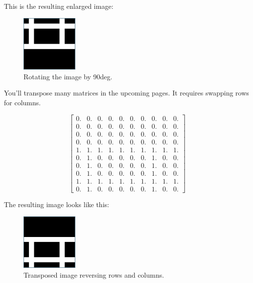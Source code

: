 This is the resulting enlarged image:

\begin{figure}[htbp]
    \centering
    \includegraphics[width=0.25\textwidth]{rotate90.png}
    \caption{Rotating the image by 90deg.}
    \label{fig:rotate90matrix}
\end{figure}

You'll transpose many matrices in the upcoming pages. It requires swapping 
rows for columns. 

$$\begin{bmatrix}
0. & 0. & 0. & 0. & 0. & 0. & 0. & 0. & 0. & 0.\\
0. & 0. & 0. & 0. & 0. & 0. & 0. & 0. & 0. & 0.\\
0. & 0. & 0. & 0. & 0. & 0. & 0. & 0. & 0. & 0.\\
0. & 0. & 0. & 0. & 0. & 0. & 0. & 0. & 0. & 0.\\
1. & 1. & 1. & 1. & 1. & 1. & 1. & 1. & 1. & 1.\\
0. & 1. & 0. & 0. & 0. & 0. & 0. & 1. & 0. & 0.\\
0. & 1. & 0. & 0. & 0. & 0. & 0. & 1. & 0. & 0.\\
0. & 1. & 0. & 0. & 0. & 0. & 0. & 1. & 0. & 0.\\
1. & 1. & 1. & 1. & 1. & 1. & 1. & 1. & 1. & 1.\\
0. & 1. & 0. & 0. & 0. & 0. & 0. & 1. & 0. & 0.
\end{bmatrix}$$

The resulting image looks like this:
\begin{figure}[htbp]
    \centering
    \includegraphics[width=0.25\textwidth]{transpose.png}
    \caption{Transposed image reversing rows and columns.}
    \label{fig:transposedMatrix}
\end{figure}


